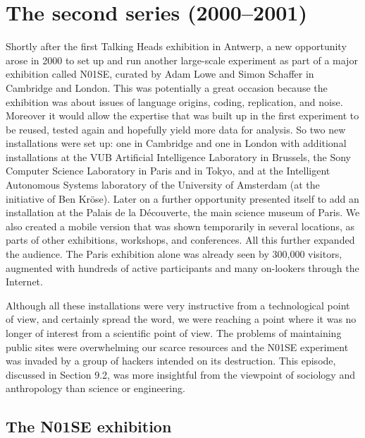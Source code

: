 \chapter{The second series (2000--2001)}
\label{c:n01se}

Shortly after the first Talking Heads exhibition in Antwerp, a new opportunity arose in 2000 to set up and run another
large-scale experiment as part of a major exhibition called N01SE, curated by Adam Lowe and Simon Schaffer in Cambridge
and London. This was potentially 
a great occasion because the exhibition was about issues of language origins, coding, replication, 
and noise. Moreover it would allow the expertise that was built up in the first experiment to be reused, 
tested again and hopefully yield more data for analysis. So two new installations were set up: one in 
Cambridge and one in London with additional installations at the VUB Artificial Intelligence 
Laboratory in Brussels, the Sony Computer Science Laboratory in Paris and in Tokyo, and at the 
Intelligent Autonomous Systems laboratory of the University of Amsterdam (at the initiative of Ben Kr\"{o}se). 
Later on a further opportunity presented itself to add an installation at the 
Palais de la D\'{e}couverte, the main science museum of Paris. 
We also created a mobile version that was shown temporarily in several locations, as parts of 
other exhibitions, workshops, and conferences.  All this further expanded the 
audience. The Paris exhibition alone was already seen 
by 300,000 visitors, augmented with hundreds of active participants and many on-lookers through the Internet. 

Although all these installations were very instructive from a technological point of view, and certainly spread 
the word, we were reaching a point where it was no longer of interest from a scientific point of view. The problems 
of maintaining public sites were overwhelming our scarce resources
and the N01SE experiment was invaded by a group of hackers intended
on its destruction. This episode, discussed in Section 9.2, was more insightful from the viewpoint of sociology 
and anthropology than science or engineering. 

\section{The N01SE exhibition} 

